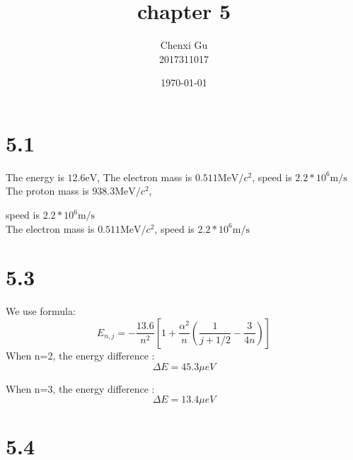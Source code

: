 \documentclass{article}
\begin{document}
\begin{CJK*}{GBK}{song}

\pagestyle{fancy}  
\fancyhead{} %
\renewcommand{\headrulewidth}{0.4pt}  
\renewcommand{\footrulewidth}{0.4pt} 



\title {chapter 5}
\author{Chenxi Gu\\2017311017}

\date{\today}

\maketitle
\section{5.1}
The energy is $12.6\text{eV}$,
The electron mass is $0.511\text{MeV/$c^2$}$, speed is $2.2*10^6\text{m/s}$\\

The proton mass is $938.3\text{MeV/$c^2$}$, 

speed is $2.2*10^6\text{m/s}$\\
The electron mass is $0.511\text{MeV/$c^2$}$, speed is $2.2*10^6\text{m/s}$\\

\section{5.3}
We use formula:
\begin{equation}
E_{n,j}=-\frac{13.6}{n^2}[1+\frac{\alpha^2}{n}(\frac{1}{j+1/2}-\frac{3}{4n})]
\end{equation}
When n=2, the energy difference :
\begin{equation}
\Delta E=45.3\text{$\mu eV$}
\end{equation}

When n=3, the energy difference :
\begin{equation}
\Delta E=13.4\text{$\mu eV$}
\end{equation}

\section{5.4}



\end{CJK*}
\end{document}
